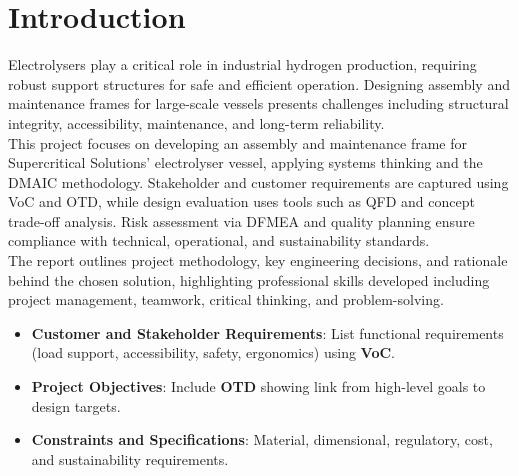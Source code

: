 \documentclass{report}
\begin{document}
\section{Introduction}
Electrolysers play a critical role in industrial hydrogen production, requiring {robust support structures} for safe and efficient operation. Designing assembly and maintenance frames for large-scale vessels presents challenges including structural integrity, accessibility, maintenance, and long-term reliability.\\[0.8em]
This project focuses on developing an assembly and maintenance frame for Supercritical Solutions’ electrolyser vessel, applying {systems thinking} and the {DMAIC methodology}. Stakeholder and customer requirements are captured using {VoC} and {OTD}, while design evaluation uses tools such as {QFD} and concept trade-off analysis. Risk assessment via {DFMEA} and quality planning ensure compliance with technical, operational, and sustainability standards.\\[0.8em]
The report outlines project methodology, key engineering decisions, and rationale behind the chosen solution, highlighting professional skills developed including {project management}, {teamwork}, {critical thinking}, and {problem-solving}.

\newpage

\color{red!50!black}
\begin{itemize}[itemsep=-1mm]
	\item \textbf{Customer and Stakeholder Requirements}: List functional requirements (load support, accessibility, safety, ergonomics) using \textbf{VoC}.
	\item \textbf{Project Objectives}: Include \textbf{OTD} showing link from high-level goals to design targets.
	\item \textbf{Constraints and Specifications}: Material, dimensional, regulatory, cost, and sustainability requirements.
\end{itemize}
\color{black}
\end{document}
